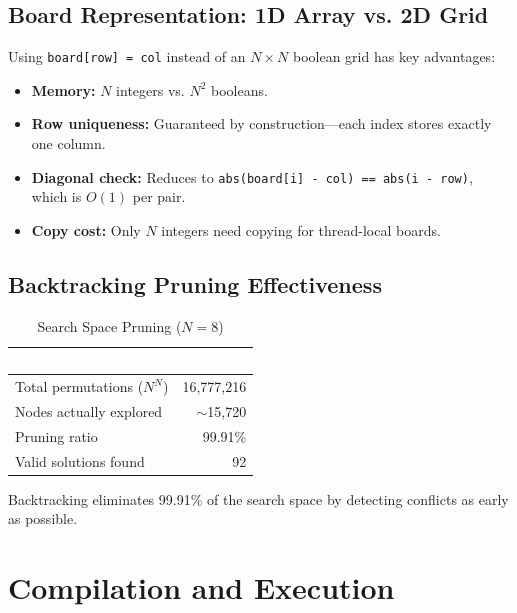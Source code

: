 \documentclass[11pt]{article}
\begin{document}
\subsection{Board Representation: 1D Array vs. 2D Grid}

Using \texttt{board[row] = col} instead of an $N \times N$ boolean grid has key advantages:

\begin{itemize}
    \item \textbf{Memory:} $N$ integers vs. $N^2$ booleans.
    \item \textbf{Row uniqueness:} Guaranteed by construction---each index stores exactly one column.
    \item \textbf{Diagonal check:} Reduces to \texttt{abs(board[i] - col) == abs(i - row)}, which is $O(1)$ per pair.
    \item \textbf{Copy cost:} Only $N$ integers need copying for thread-local boards.
\end{itemize}

\subsection{Backtracking Pruning Effectiveness}

\begin{table}[htbp]
\centering
\sffamily\small
\caption{Search Space Pruning ($N = 8$)}
\vspace{6pt}
\begin{tabular}{@{}lr@{}}
\toprule
\rowcolor{tableheader}
\textcolor{white}{\textbf{Metric}} & \textcolor{white}{\textbf{Value}} \\
\midrule
\rowcolor{rowalt}
Total permutations ($N^N$) & 16,777,216 \\
Nodes actually explored & $\sim$15,720 \\
\rowcolor{rowalt}
Pruning ratio & 99.91\% \\
Valid solutions found & 92 \\
\bottomrule
\end{tabular}
\end{table}

Backtracking eliminates 99.91\% of the search space by detecting conflicts as early as possible.

\section{Compilation and Execution}
\end{document}

